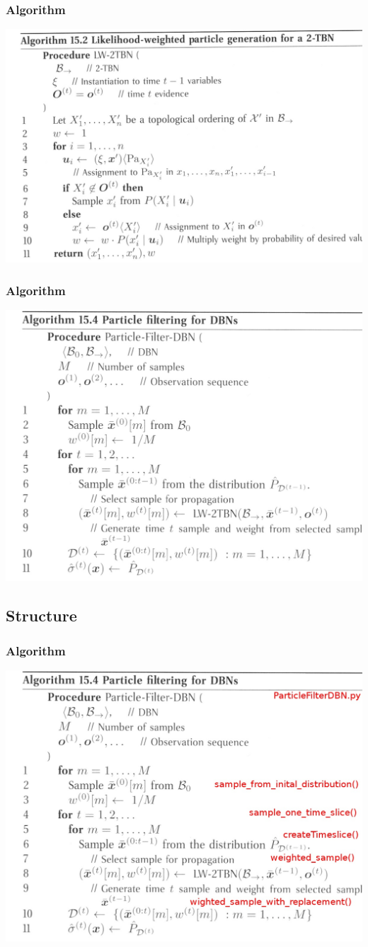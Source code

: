 \begin{frame}
\frametitle{Algorithm}
\includegraphics[width=1\textwidth]{figures/lwalg}
\end{frame}

\begin{frame}
\frametitle{Algorithm}
\includegraphics[width=.8\textwidth]{figures/pfalg}
\end{frame}

\subsection{Structure}
\begin{frame}
\frametitle{Algorithm}
\includegraphics[width=.8\textwidth]{figures/pfalg_code}
\end{frame}

